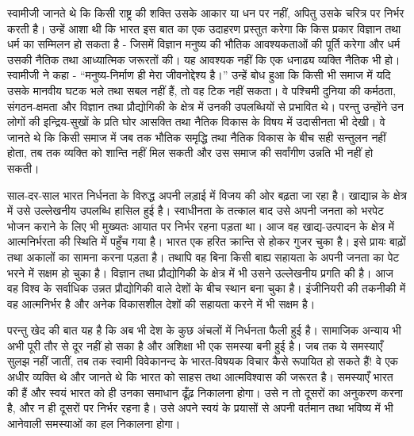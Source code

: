 स्वामीजी जानते थे कि किसी राष्ट्र की शक्ति उसके आकार या धन पर नहीं, अपितु उसके चरित्र पर निर्भर करती है। उन्हें आशा थी कि भारत इस बात का एक उदाहरण प्रस्तुत करेगा कि किस प्रकार विज्ञान तथा धर्म का सम्मिलन हो सकता है - जिसमें विज्ञान मनुष्य की भौतिक आवश्यकताओं की पूर्ति करेगा और धर्म उसकी नैतिक तथा आध्यात्मिक जरूरतों की। यह आवश्यक नहीं कि एक धनाढ्य व्यक्ति नैतिक भी हो। स्वामीजी ने कहा - “मनुष्य-निर्माण ही मेरा जीवनोद्देश्य है।” उन्हें बोध हुआ कि किसी भी समाज में यदि उसके मानवीय घटक भले तथा सबल नहीं हैं, तो वह टिक नहीं सकता। वे पश्चिमी दुनिया की कर्मठता, संगठन-क्षमता और विज्ञान तथा प्रौद्योगिकी के क्षेत्र में उनकी उपलब्धियों से प्रभावित थे। परन्तु उन्होंने उन लोगों की इन्द्रिय-सुखों के प्रति घोर आसक्ति तथा नैतिक विकास के विषय में उदासीनता भी देखी। वे जानते थे कि किसी समाज में जब तक भौतिक समृद्धि तथा नैतिक विकास के बीच सही सन्तुलन नहीं होता, तब तक व्यक्ति को शान्ति नहीं मिल सकती और उस समाज की सर्वांगीण उन्नति भी नहीं हो सकती। 

साल-दर-साल भारत निर्धनता के विरुद्ध अपनी लड़ाई में विजय की ओर बढ़ता जा रहा है। खाद्यान्न के क्षेत्र में उसे उल्लेखनीय उपलब्धि हासिल हुई है। स्वाधीनता के तत्काल बाद उसे अपनी जनता को भरपेट भोजन कराने के लिए भी मुख्यतः आयात पर निर्भर रहना पड़ता था। आज वह खाद्य-उत्पादन के क्षेत्र में आत्मनिर्भरता की स्थिति में पहुँच गया है। भारत एक हरित क्रान्ति से होकर गुजर चुका है। इसे प्रायः बाढ़ों तथा अकालों का सामना करना पड़ता है। तथापि वह बिना किसी बाह्य सहायता के अपनी जनता का पेट भरने में सक्षम हो चुका है। विज्ञान तथा प्रौद्योगिकी के क्षेत्र में भी उसने उल्लेखनीय प्रगति की है। आज वह विश्व के सर्वाधिक उन्नत प्रौद्योगिकी वाले देशों के बीच स्थान बना चुका है। इंजीनियरी की तकनीकी में वह आत्मनिर्भर है और अनेक विकासशील देशों की सहायता करने में भी सक्षम है। 

परन्तु खेद की बात यह है कि अब भी देश के कुछ अंचलों में निर्धनता फैली हुई है। सामाजिक अन्याय भी अभी पूरी तौर से दूर नहीं हो सका है और अशिक्षा भी एक समस्या बनी हुई है। जब तक ये समस्याएँ सुलझ नहीं जातीं, तब तक स्वामी विवेकानन्द के भारत-विषयक विचार कैसे रूपायित हो सकते हैं! वे एक अधीर व्यक्ति थे और जानते थे कि भारत को साहस तथा आत्मविश्वास की जरूरत है। समस्याएँ भारत की हैं और स्वयं भारत को ही उनका समाधान ढूँढ़ निकालना होगा। उसे न तो दूसरों का अनुकरण करना है, और न ही दूसरों पर निर्भर रहना है। उसे अपने स्वयं के प्रयासों से अपनी वर्तमान तथा भविष्य में भी आनेवाली समस्याओं का हल निकालना होगा। 

\delimiter

